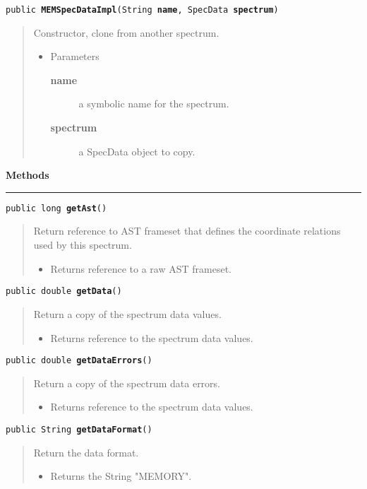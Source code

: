 \documentclass[twoside,11pt,nolof]{starlink}
\providecommand{\method}[1]{\texttt{#1}}
\newenvironment{desc}{\begin{quote}}{\end{quote}}
\providecommand{\methods}{
   \par\textbf{\large{Methods}}\\
   \hrule
}
\begin{document}
\method{public \textbf{MEMSpecDataImpl}(\texttt{String} \textbf{name}, \texttt{SpecData} \textbf{spectrum})\label{l5}\label{l6}}
\begin{desc}Constructor, clone from another spectrum.
\begin{itemize}
\item{Parameters
  \begin{description}
   \item[\textbf{name}]{a symbolic name for the spectrum.}
   \item[\textbf{spectrum}]{a SpecData object to copy.}
  \end{description}}
\end{itemize}
\end{desc}

\methods
\method{public long \textbf{getAst}()\label{l7}\label{l8}}
\begin{desc}Return reference to AST frameset that defines the coordinate
 relations used by this spectrum.
\begin{itemize}
\item{Returns reference to a raw AST frameset. }
\end{itemize}
\end{desc}

\method{public double \textbf{getData}()\label{l9}\label{l10}}
\begin{desc}Return a copy of the spectrum data values.
\begin{itemize}
\item{Returns reference to the spectrum data values. }
\end{itemize}
\end{desc}

\method{public double \textbf{getDataErrors}()\label{l11}\label{l12}}
\begin{desc}Return a copy of the spectrum data errors.
\begin{itemize}
\item{Returns reference to the spectrum data values. }
\end{itemize}
\end{desc}

\method{public String \textbf{getDataFormat}()\label{l13}\label{l14}}
\begin{desc}Return the data format.
\begin{itemize}
\item{Returns the String "MEMORY". }
\end{itemize}
\end{desc}
\end{document}

